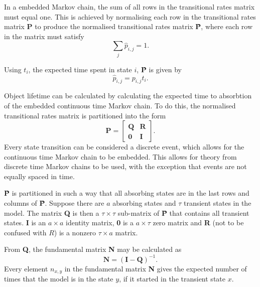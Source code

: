 In a embedded Markov chain, the sum of all rows in the transitional rates matrix must equal one. This is achieved by normalising each row in the transitional rates matrix \textbf{P} to produce the normalised transitional rates matrix \textbf{\^{P}}, where each row in the matrix must satisfy
%
\begin{equation} \label{eq_markov_sum}
    \sum_{j} \hat{p}_{i, j} = 1.
\end{equation}

Using $t_i$, the expected time spent in state $i$, \textbf{\^{P}} is given by
%
\begin{equation} \label{eq_markov_normalisation}
    \hat{p}_{i, j} = p_{i, j} t_i.
\end{equation}

Object lifetime can be calculated by calculating the expected time to absorbtion of the embedded continuous time Markov chain. To do this, the normalised transitional rates matrix is partitioned into the form
%
\begin{equation} \label{matrix_partition}
    \textbf{\^{P}} = \left[\begin{array}{c|c}
                   \textbf{Q} & \textbf{R} \\
                   \hline
                   \textbf{0} & \textbf{I}
                 \end{array}\right].
\end{equation}
%
Every state transition can be considered a discrete event, which allows for the continuous time Markov chain to be embedded. This allows for theory from discrete time Markov chains to be used, with the exception that events are not equally spaced in time.

\textbf{\^{P}} is partitioned in such a way that all absorbing states are in the last rows and columns of \textbf{\^{P}}. Suppose there are $a$ absorbing states and $\tau$ transient states in the model. The matrix \textbf{Q} is then a $\tau\times\tau$ sub-matrix of \textbf{\^{P}} that contains all transient states. \textbf{I} is an $a \times a$ identity matrix, \textbf{0} is a $a\times\tau$ zero matrix and \textbf{R} (not to be confused with $R$) is a nonzero $\tau\times a$ matrix.

From \textbf{Q}, the fundamental matrix \textbf{N} may be calculated as \cite{grinstead1997introduction_probability}
%
\begin{equation} \label{eq_fundamental_mat}
    \textbf{N} = (\textbf{I} - \textbf{Q})^{-1}.
\end{equation}
%
Every element $n_{x,y}$ in the fundamental matrix \textbf{N} gives the expected number of times that the model is in the state $y$, if it started in the transient state $x$.


